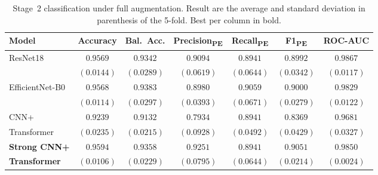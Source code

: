 \documentclass[preprint,12pt,authoryear]{elsarticle}
\begin{document}
\begin{table}
  \caption{Stage~2 classification under full augmentation. Result are the average and standard deviation in parenthesis of the 5-fold. Best per column in bold.}
  \label{benchmark}
\begin{small}
  \centering
  \setlength{\tabcolsep}{5pt}
  \begin{tabular}{lcccccc}
    \toprule
    \textbf{Model}
      & \textbf{Accuracy}      & \textbf{Bal.\ Acc.}      & \textbf{Precision\textsubscript{PE}}      & \textbf{Recall\textsubscript{PE}}      & \textbf{F1\textsubscript{PE}}      & \textbf{ROC-AUC} \\
    \midrule
    ResNet18 & $0.9569$ & $0.9342$ & $0.9094$      & $0.8941$      & $0.8992$     & $\mathbf{0.9867}$ \\
     & $(0.0144)$ & $(0.0289)$      & $(0.0619)$      & $(0.0644)$      & $(0.0342)$      & $\mathbf{(0.0117)}$ \\
\hline
EfficientNet-B0      & $0.9568$      & $\mathbf{0.9383}$      & $0.8980$      & $\mathbf{0.9059}$      & $0.9000$      & $0.9829$ \\
      & $(0.0114)$      & $\mathbf{(0.0297)}$      & $(0.0393)$      & $\mathbf{(0.0671)}$      & $(0.0279)$      & $(0.0122)$ \\
\hline
    CNN+      & $0.9239$      & $0.9132$      & $0.7934$      & $0.8941$      & $0.8369$      & $0.9681$ \\
    Transformer      & $(0.0235)$      & $(0.0215)$      & $(0.0928)$      & $(0.0492)$      & $(0.0429)$      & $(0.0327)$ \\
\hline
    \textbf{Strong CNN+}      & $\mathbf{0.9594}$      & $0.9358$      & $\mathbf{0.9251}$      & $0.8941$      & $\mathbf{0.9051}$      & $0.9850$ \\
    \textbf{Transformer}      & $\mathbf{(0.0106)}$      & $(0.0229)$      & $\mathbf{(0.0795)}$      & $(0.0644)$      & $\mathbf{(0.0214)}$      & $(0.0024)$ \\
    \bottomrule
  \end{tabular}
\end{small}
\end{table}
\end{document}
